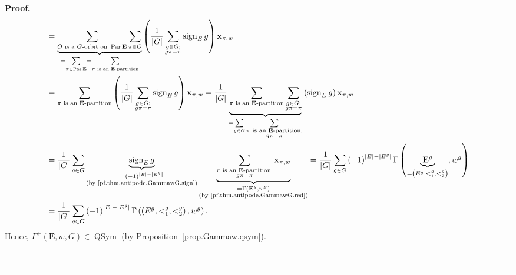 \documentclass[numbers=enddot,12pt,final,onecolumn,notitlepage,abstracton]{scrartcl}
\theoremstyle{definition}
\newenvironment{proof}[1][Proof]{\noindent\textbf{#1.} }{\ \rule{0.5em}{0.5em}}
\let\sumnonlimits\sum
\renewcommand{\sum}{\sumnonlimits\limits}
\newenvironment{verlong}{}{}
\newcommand{\xx}{{\mathbf{x}}}
\newcommand{\QSym}{{\operatorname{QSym}}}
\newcommand{\Par}{\operatorname{Par}}
\newcommand{\sign}{\operatorname{sign}}
\newcommand{\EE}{{\mathbf{E}}}
\begin{document}
\begin{proof}
\begin{verlong}
\begin{align}
&  =\underbrace{\sum_{O\text{ is a }G\text{-orbit on } \Par
\EE }\sum\limits_{\pi\in O}}_{=\sum_{\pi\in \Par
\EE }=\sum_{\pi\text{ is an } \EE \text{-partition}}}\left(
\dfrac{1}{\left\vert G\right\vert }\sum_{\substack{g\in G;\\g\pi=\pi
}} \sign_E g \right)  \xx_{\pi,w}\nonumber\\
&  =\sum_{\pi\text{ is an } \EE \text{-partition}}\left(  \dfrac
{1}{\left\vert G\right\vert }\sum_{\substack{g\in G;\\g\pi=\pi}%
} \sign_E g \right)  \xx_{\pi,w}=\dfrac
{1}{\left\vert G\right\vert }\underbrace{\sum_{\pi\text{ is an }
\EE\text{-partition}}
\sum_{\substack{g\in G;\\g\pi=\pi}}}_{=\sum_{g\in G}%
\sum_{\substack{\pi\text{ is an } \EE \text{-partition;}\\g\pi=\pi}%
}}\left(   \sign_E g \right)  \xx_{\pi,w}
\nonumber\\
&  =\dfrac{1}{\left\vert G\right\vert }\sum_{g\in G}%
\underbrace{ \sign_E g }_{\substack{=\left(  -1\right)
^{\left\vert E\right\vert -\left\vert E^{g}\right\vert }\\\text{(by
\eqref{pf.thm.antipode.GammawG.sign})}}}\underbrace{\sum_{\substack{\pi\text{
is an } \EE \text{-partition;}\\g\pi=\pi}}\xx_{\pi,w}%
}_{\substack{=\Gamma\left(   \EE ^{g},w^{g}\right)  \\\text{(by
\eqref{pf.thm.antipode.GammawG.red})}}}
=\dfrac{1}{\left\vert G\right\vert }\sum_{g\in G}\left(  -1\right)
^{\left\vert E\right\vert -\left\vert E^{g}\right\vert }\Gamma\left(
 \underbrace{\EE^{g}}_{=\left(E^g, <_1^g, <_2^g\right)},w^{g}\right)
\nonumber\\
&= \dfrac{1}{\left\vert G\right\vert }\sum_{g\in G}\left(  -1\right)
^{\left\vert E\right\vert -\left\vert E^{g}\right\vert }\Gamma\left(
 \left(E^g, <_1^g, <_2^g\right),w^{g}\right) .
\label{pf.thm.antipode.GammawG.Gammaplus}
\end{align}
Hence, $\Gamma^+\left( \EE ,w,G\right) \in \QSym$
(by Proposition~\ref{prop.Gammaw.qsym}).
\end{verlong}


\end{proof}
\end{document}
